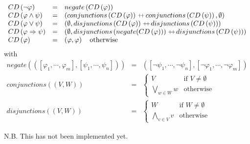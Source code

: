 \begin{equation*}
\begin{array}{lll}
CD\left( \lnot \varphi \right) & = & negate\left( CD\left( \varphi \right)
\right) \\ 
CD\left( \varphi \wedge \psi \right) & = & \left( conjunctions\left(
CD\left( \varphi \right) \right) \concat conjunctions\left( CD\left( \psi
\right) \right) ,\emptyset \right) \\ 
CD\left( \varphi \vee \psi \right) & = & \left( \emptyset
,disjunctions\left( CD\left( \varphi \right) \right) \concat %
disjunctions\left( CD\left( \psi \right) \right) \right) \\ 
CD\left( \varphi \Rightarrow \psi \right) & = & \left( \emptyset
,disjunctions\left( negate(CD\left( \varphi \right) )\right) \concat %
disjunctions\left( CD\left( \psi \right) \right) \right) \\ 
CD\left( \varphi \right) & = & \left( \varphi ,\varphi \right) \text{
otherwise}%
\end{array}%
\end{equation*}%
with%
\begin{equation*}
\begin{array}{lll}
negate\left( \left( \left[ \varphi _{1},\cdots ,\varphi _{m}\right] ,\left[
\psi _{1},\cdots ,\psi _{n}\right] \right) \right) & = & \left( \left[ \lnot
\psi _{1},\cdots ,\lnot \psi _{n}\right] ,\left[ \lnot \varphi _{1},\cdots
,\lnot \varphi _{m}\right] \right) \\ 
conjunctions\left( \left( V,W\right) \right) & = & \left\{ 
\begin{array}{ll}
V & \text{if }V\neq \emptyset \\ 
\bigvee\limits_{w\in W}w & \text{otherwise}%
\end{array}%
\right. \\ 
disjunctions\left( \left( V,W\right) \right) & = & \left\{ 
\begin{array}{ll}
W & \text{if }W\neq \emptyset \\ 
\bigwedge\limits_{v\in V}v & \text{otherwise}%
\end{array}%
\right.%
\end{array}%
\end{equation*}

N.B. This has not been implemented yet.\newpage 
